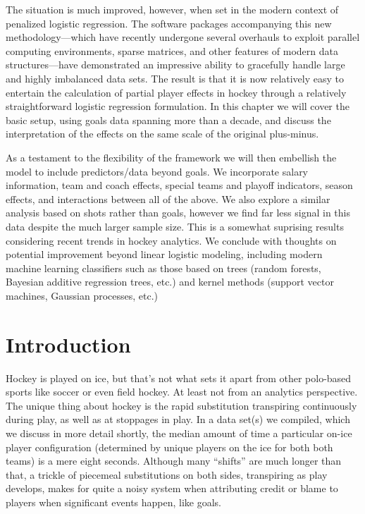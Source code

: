 The situation is much improved, however, when set in the modern context of
penalized logistic regression.  The software packages accompanying this new
methodology---which have recently undergone several overhauls to exploit
parallel computing environments, sparse matrices, and other features of modern
data structures---have demonstrated an impressive ability to gracefully handle
large and highly imbalanced data sets.  The result is that it is now relatively
easy to entertain the calculation of partial player effects in hockey through
a relatively straightforward logistic regression formulation.  In this chapter
we will cover the basic setup, using goals data spanning more than a decade,
and discuss the interpretation of the effects on the same scale of the
original plus-minus.  

As a testament to the flexibility of the framework we will then embellish the
model to include predictors/data beyond goals.  We incorporate salary
information, team and coach effects, special teams and playoff indicators,
season effects, and interactions between all of the above.  We also explore a
similar analysis based on shots rather than goals, however we find far less
signal in this data despite the much larger sample size.  This is a somewhat
suprising results considering recent trends in hockey analytics.  We conclude
with thoughts on potential improvement beyond linear logistic modeling,
including modern machine learning classifiers such as those based on trees
(random forests, Bayesian additive regression trees, etc.) and kernel methods
(support vector machines, Gaussian processes, etc.)

\section{Introduction}

Hockey is played on ice, but that's not what sets it apart from other
polo-based sports like soccer or even field hockey.  At least not from an
analytics perspective.  The unique thing about hockey is the rapid
substitution transpiring continuously during play, as well as at stoppages in
play.  In a data set(s) we compiled, which we discuss in more detail shortly, the
median amount of time a particular on-ice player configuration (determined by
unique players on the ice for both both teams) is a mere eight seconds.
Although many ``shifts'' are much longer than that, a trickle of piecemeal
substitutions on both sides, transpiring as play develops, makes for quite a
noisy system when attributing credit or blame to players when significant
events happen, like goals.

